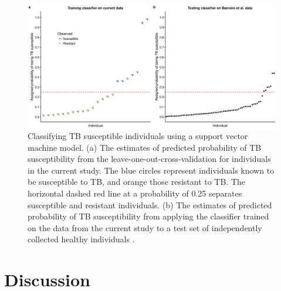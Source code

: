 \documentclass[fleqn,10pt]{wlscirep}
\begin{document}
\begin{figure}[ht]
\centering
\includegraphics[width=\linewidth]{../figure/classifier-svm.eps}
\caption{
Classifying TB susceptible individuals using a support vector machine
model. (a) The estimates of predicted probability of TB susceptibility
from the leave-one-out-cross-validation for individuals in the current
study. The blue circles represent individuals known to be susceptible
to TB, and orange those resistant to TB. The horizontal dashed red
line at a probability of 0.25 separates susceptible and resistant
individuals. (b) The estimates of predicted probability of TB
susceptibility from applying the classifier trained on the data from
the current study to a test set of independently collected healthy
individuals \cite{Barreiro2012}.
}
\label{fig:classifier}
\end{figure}

\section*{Discussion}
\end{document}
